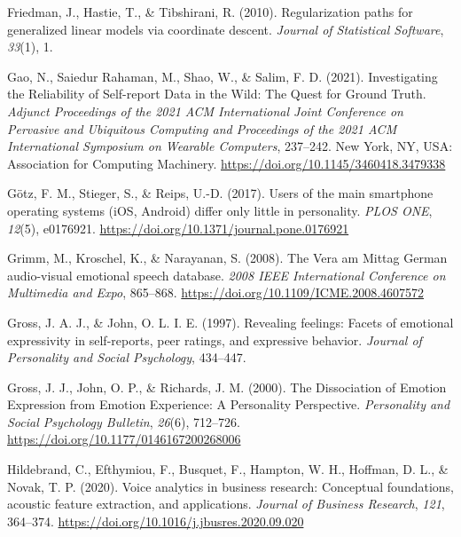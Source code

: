 \documentclass[
  english,
  man,floatsintext]{apa6}
\newlength{\cslhangindent}
\newenvironment{CSLReferences}[2] %
 {%
  \setlength{\parindent}{0pt}
  \ifodd #1 \everypar{\setlength{\hangindent}{\cslhangindent}}\ignorespaces\fi
  \ifnum #2 > 0
  \setlength{\parskip}{#2\baselineskip}
  \fi
 }%
 {}
\begin{document}
\begin{CSLReferences}{1}{0}
\leavevmode{}%
Friedman, J., Hastie, T., \& Tibshirani, R. (2010). Regularization paths for generalized linear models via coordinate descent. \emph{Journal of Statistical Software}, \emph{33}(1), 1.

\leavevmode{}%
Gao, N., Saiedur Rahaman, M., Shao, W., \& Salim, F. D. (2021). Investigating the {Reliability} of {Self-report Data} in the {Wild}: {The Quest} for {Ground Truth}. \emph{Adjunct {Proceedings} of the 2021 {ACM International Joint Conference} on {Pervasive} and {Ubiquitous Computing} and {Proceedings} of the 2021 {ACM International Symposium} on {Wearable Computers}}, 237--242. New York, NY, USA: Association for Computing Machinery. \url{https://doi.org/10.1145/3460418.3479338}

\leavevmode{}%
Götz, F. M., Stieger, S., \& Reips, U.-D. (2017). Users of the main smartphone operating systems ({iOS}, {Android}) differ only little in personality. \emph{PLOS ONE}, \emph{12}(5), e0176921. \url{https://doi.org/10.1371/journal.pone.0176921}

\leavevmode{}%
Grimm, M., Kroschel, K., \& Narayanan, S. (2008). The {Vera} am {Mittag German} audio-visual emotional speech database. \emph{2008 {IEEE International Conference} on {Multimedia} and {Expo}}, 865--868. \url{https://doi.org/10.1109/ICME.2008.4607572}

\leavevmode{}%
Gross, J. A. J., \& John, O. L. I. E. (1997). Revealing feelings: {Facets} of emotional expressivity in self-reports, peer ratings, and expressive behavior. \emph{Journal of Personality and Social Psychology}, 434--447.

\leavevmode{}%
Gross, J. J., John, O. P., \& Richards, J. M. (2000). The {Dissociation} of {Emotion Expression} from {Emotion Experience}: {A Personality Perspective}. \emph{Personality and Social Psychology Bulletin}, \emph{26}(6), 712--726. \url{https://doi.org/10.1177/0146167200268006}

\leavevmode{}%
Hildebrand, C., Efthymiou, F., Busquet, F., Hampton, W. H., Hoffman, D. L., \& Novak, T. P. (2020). Voice analytics in business research: {Conceptual} foundations, acoustic feature extraction, and applications. \emph{Journal of Business Research}, \emph{121}, 364--374. \url{https://doi.org/10.1016/j.jbusres.2020.09.020}


\end{CSLReferences}
\end{document}
